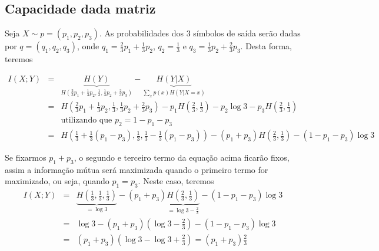 \subsection{Capacidade dada matriz}

\begin{questions}

\begin{solution}

Seja $X \sim p = (p_1, p_2, p_3)$. As probabilidades dos 3 símbolos de saída
serão dadas por $q = (q_1, q_2, q_3)$, onde $q_1 = \frac{2}{3} p_1 + \frac{1}{3} p_2$,
$q_2 = \frac{1}{3}$ e $q_3 = \frac{1}{3} p_2 + \frac{2}{3} p_3$. Desta forma, teremos

\begin{eqnarray}
I(X;Y) &=& \underbrace{H(Y)}_{H\left( \frac{2}{3} p_1 + \frac{1}{3} p_2, \frac{1}{3}, \frac{1}{3} p_2 + \frac{2}{3} p_3 \right)} - \underbrace{H(Y|X)}_{\sum_x p(x) H(Y|X = x)} \nonumber \\
        &=& H\left( \frac{2}{3} p_1 + \frac{1}{3} p_2, \frac{1}{3}, \frac{1}{3} p_2 + \frac{2}{3} p_3 \right) - p_1 H\left( \frac{2}{3}, \frac{1}{3} \right) - p_2 \log 3 - p_3 H\left( \frac{2}{3}, \frac{1}{3} \right) \nonumber \\
        && \text{utilizando que } p_2 = 1 - p_1 - p_3 \nonumber \\
        &=& H\left( \frac{1}{3} + \frac{1}{3} (p_1 - p_3), \frac{1}{3}, \frac{1}{3} - \frac{1}{3} (p_1 - p_3) \right) -
        (p_1 + p_3) H\left( \frac{2}{3}, \frac{1}{3} \right) - (1-p_1-p_3) \log 3 
\end{eqnarray}

Se fixarmos $p_1 + p_3$, o segundo e terceiro termo da equação acima ficarão fixos, assim 
a informação mútua será maximizada quando o primeiro termo for maximizado, ou seja,
quando $p_1 = p_3$. Neste caso, teremos
\begin{eqnarray}
I(X;Y) &=&  \underbrace{H\left( \frac{1}{3},  \frac{1}{3},  \frac{1}{3} \right)}_{= \log 3 } - (p_1 + p_3) \underbrace{ H\left( \frac{2}{3}, \frac{1}{3} \right) }_{= \log 3 - \frac{2}{3} } - (1- p_1 - p_3) \log 3 \nonumber \\
        &=&  \log 3 - (p_1 + p_3) \left( \log 3 - \frac{2}{3} \right)  - (1- p_1 - p_3) \log 3 \nonumber  \\
        &=& (p_1 + p_3) \left( \log 3 -   \log 3 + \frac{2}{3} \right) = (p_1 + p_3) \frac{2}{3} 
\end{eqnarray}



\end{solution}
\end{questions}
